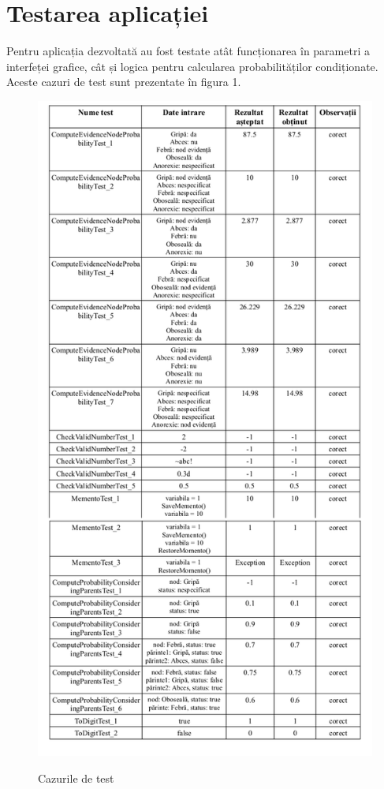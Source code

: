 \documentclass[12pt]{article}
\begin{document}
\section{Testarea aplicației}
Pentru aplicația dezvoltată au fost testate atât funcționarea în parametri	 a interfeței grafice, cât și logica pentru calcularea probabilităților condiționate. 
Aceste cazuri de test sunt prezentate în figura 1.
\begin{figure}[H]
	\centering
	\includegraphics[scale=0.38]{raport}
	\label{fig:testCases}
	\caption{Cazurile de test}
\end{figure}
\end{document}
